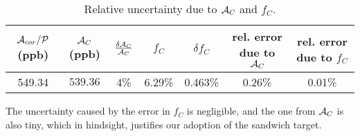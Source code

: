 \begin{table}[!h]
    \centering
    \begin{tabular}{c | c c | c c | c c}
        \hline
	\thead{$\mathcal{A}_{cor}/\mathcal{P}$ \\ (ppb)}   & \thead{$\mathcal{A}_C$ \\ (ppb)}   & $\frac{\delta\mathcal{A}_C}{\mathcal{A}_C}$   & $f_C$ & $\delta f_C$  & \thead{rel. error \\ due to $\mathcal{A}_C$ } & \thead{rel. error \\ due to $f_C$}\\
        \hline
	549.34	& $539.36$  & 4\%   & 6.29\%	& 0.463\%   & 0.26\%	& 0.01\% \\
        \hline
    \end{tabular}
    \caption{Relative uncertainty due to $\mathcal{A}_C$ and $f_C$.}
    \label{tab:prex_C_contam}
\end{table}
The uncertainty caused by the error in $f_C$ is negligible, and the one from $\mathcal{A}_C$
is also tiny, which in hindsight, justifies our adoption of the sandwich target.

\begin{comment}
\bigskip
One could also estimate the rate from measurement. 
\begin{eqaution}
    \sigma = \sqrt{\frac{1}{R/30}}
\end{eqaution}
\begin{table}[!h]
    \centering
    \begin{tabular}{c c c | c c c c c c}
	\hline
	Target	& run	& I $(\mu A)$   & \thead{rms \\ ($ppm$)} & \thead{rms@$70\ \mu A$ \\ ($ppm$)} & \thead{bcm res. \\ ($ppm$)}   & \thead{bpm res. \\ ($ppm$)}   & \thead{cor. rms \\ ($ppm$)}  & \thead{rate \\ ($GHz$)}  \\
	\hline
	C12	& 4133	& 86.2	& 143	& 158.7	& 20	& 25	& 150.4	& 1.326	\\
	D-Pb-D	& 4112	& 67.7	& 93	& 91.5	& 20	& 25	& 82.9	& 4.365	\\
	\hline
    \end{tabular}
    \caption{The corrected rms was calculated as: $\sqrt{\frac{\sigma^2 - \sigma^2_{bcm} - \sigma^2_{bpm}}{1 + 0.26^2}}$}
\end{table}
The C graphite target has a thickness of $1.991\ mm$ and a density of 
\end{comment}


